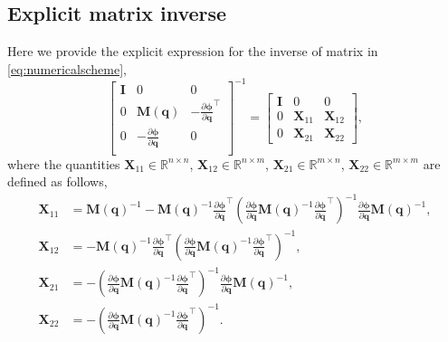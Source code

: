 \chapter{}
	\label{sec:appendix}
	\section{Explicit matrix inverse}
		\label{subsec:matrixinverse}
		Here we provide the explicit expression for the inverse of matrix in \cref{eq:numericalscheme},
		\begin{equation*}
			\begin{bmatrix}
				\bm{I} 	&	0		&	0 \\
				0	& 	\bm{M}(\bm{q}) 	&	-\frac{\partial\bm{\phi}}{\partial\bm{q}}^{\intercal} \\
				0 	& -\frac{\partial\bm{\phi}}{\partial\bm{q}} & 0\\
			\end{bmatrix}^{-1}
			= 
			\begin{bmatrix}
				\bm{I} 	&	0		&	0 			\\
				0	& 	\bm{X}_{11} &	\bm{X}_{12} \\
				0 	& 	\bm{X}_{21} & 	\bm{X}_{22}
			\end{bmatrix},
		\end{equation*}	
		where the quantities $\bm{X}_{11}\in\mathbb{R}^{n\times n}$, $\bm{X}_{12}\in\mathbb{R}^{n\times m}$, $\bm{X}_{21}\in\mathbb{R}^{m\times n}$, $\bm{X}_{22}\in\mathbb{R}^{m\times m}$ are defined as follows,
		\begin{subequations}
			\begin{align*}
				\bm{X}_{11} &= \bm{M}(\bm{q})^{-1}- \bm{M}(\bm{q})^{-1}\frac{\partial\bm{\phi}}{\partial\bm{q}}^{\intercal}\left(\frac{\partial\bm{\phi}}{\partial\bm{q}}\bm{M}(\bm{q})^{-1}\frac{\partial\bm{\phi}}{\partial\bm{q}}^{\intercal}\right)^{-1}\frac{\partial\bm{\phi}}{\partial\bm{q}}\bm{M}(\bm{q})^{-1}, \\
				\bm{X}_{12} &= -\bm{M}(\bm{q})^{-1}\frac{\partial\bm{\phi}}{\partial\bm{q}}^{\intercal}\left(\frac{\partial\bm{\phi}}{\partial\bm{q}}\bm{M}(\bm{q})^{-1}\frac{\partial\bm{\phi}}{\partial\bm{q}}^{\intercal}\right)^{-1}, \\
				\bm{X}_{21} &= - \left(\frac{\partial\bm{\phi}}{\partial\bm{q}}\bm{M}(\bm{q})^{-1}\frac{\partial\bm{\phi}}{\partial\bm{q}}^{\intercal}\right)^{-1}\frac{\partial\bm{\phi}}{\partial\bm{q}}\bm{M}(\bm{q})^{-1}, \\
				\bm{X}_{22} &= -\left(\frac{\partial\bm{\phi}}{\partial\bm{q}}\bm{M}(\bm{q})^{-1}\frac{\partial\bm{\phi}}{\partial\bm{q}}^{\intercal}\right)^{-1}.
			\end{align*}
		\end{subequations}
